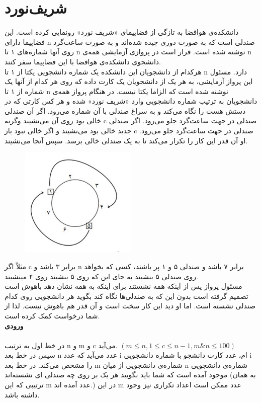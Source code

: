 \documentclass[]{article}
\begin{document}
\section{شریف‌نورد}
دانشکده‌ی هوافضا به تازگی از فضاپیمای «شریف نورد» رونمایی کرده است. این فضاپیما دارای n صندلی است که به صورت دوری چیده شده‌اند و به صورت ساعت‌گرد روی آنها شماره‌های ١ تا n نوشته شده است. قرار است در پروازی آزمایشی همه‌ی n دانشجوی دانشکده‌ی هوافضا با این فضاپیما سفر کنند.\\
هرکدام از دانشجویان این دانشکده یک شماره دانشجویی یکتا از ١ تا n دارد. مسئول این پرواز آزمایشی، به هر یک از دانشجویان یک کارت داده که روی هر کدام از آنها یک شماره از ١ تا n نوشته شده است که الزاما یکتا نیست. در هنگام پرواز همه‌ی دانشجویان به ترتیب شماره دانشجویی وارد «شریف نورد» شده و هر کس کارتی که در دستش هست را نگاه می‌کند و به سراغ صندلی با آن شماره می‌رود. اگر آن صندلی خالی بود روی آن می‌نشیند وگرنه c صندلی در جهت ساعت‌گرد جلو می‌رود. اگر صندلی جدید خالی بود می‌نشیند و اگر خالی نبود باز c صندلی در جهت ساعت‌گرد جلو می‌رود. او آن قدر این کار را تکرار می‌کند تا به یک صندلی خالی برسد. سپس آنجا می‌نشیند.\\
\begin{figure}[h]
\centering
\includegraphics[width=0.5\textwidth]{sharifnavard.JPG}
\end{figure}

مثلاً اگر c برابر ٣ باشد و n برابر ٧ باشد و صندلی ۵ و ١ پر باشند، کسی که بخواهد روی صندلی ۵ بنشیند به جای این که روی ۵ بنشیند روی ۴ مینشیند.\\
مسئول پرواز پس از اینکه همه نشستند برای اینکه به همه نشان دهد باهوش است تصمیم گرفته است بدون این که به صندلی‌ها نگاه کند بگوید هر دانشجویی روی کدام صندلی نشسته است. اما او دید این کار سخت است و آن قدر هم باهوش نیست. لذا از شما درخواست کمک کرده است.\\

\textbf{ورودی}\\\\
در خط اول به ترتیب n و m و c می‌آید. $(m \leq n , 1 \leq c \leq n-1 , m \& n \leq 100)$\\
سپس در خط بعد n عدد می‌آید که عدد i ام، عدد کارت دانشجو با شماره دانشجویی i را مشخص می‌کند. در خط بعد m شماره‌ی دانشجویی از میان n شماره‌ی دانشجویی موجود آمده است که شما باید بگویید هر یک بر روی چه صندلی ای نشسته‌اند (به همان ترتیبی که این m عدد آمده اند.) در این m عدد ممکن است اعداد تکراری نیز وجود داشته باشد.\\
\end{document}
